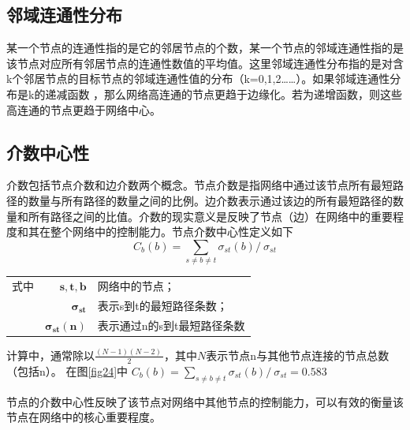 \subsection{邻域连通性分布}
某一个节点的连通性指的是它的邻居节点的个数，某一个节点的邻域连通性指的是该节点对应所有邻居节点的连通性数值的平均值。这里邻域连通性分布指的是对含k个邻居节点的目标节点的邻域连通性值的分布（k=0,1,2……）。如果邻域连通性分布是k的递减函数 ，那么网络高连通的节点更趋于边缘化。若为递增函数，则这些高连通的节点更趋于网络中心。
\subsection{介数中心性}
介数包括节点介数和边介数两个概念。节点介数是指网络中通过该节点所有最短路径的数量与所有路径的数量之间的比例。边介数表示通过该边的所有最短路径的数量和所有路径之间的比值。介数的现实意义是反映了节点（边）在网络中的重要程度和其在整个网络中的控制能力。节点介数中心性定义如下
\begin{equation}\label{eq26}
	C_{b}( b) =\sum\limits _{s\neq b\neq t} \sigma_{st}( b) /\ \sigma_{st}
\end{equation}

\begin{tabularx}{\textwidth}{@{}l@{\quad}r@{———}X@{}}
式中 & $\boldsymbol{s,t,b}$ &  网络中的节点；\\
	& $\boldsymbol{ \sigma_{st}}$ &   表示s到t的最短路径条数；\\
	& $\boldsymbol{\sigma_{st}( n)}$ &	表示通过n的s到t最短路径条数 \\
\end{tabularx}\vspace{3.15bp}
计算中，通常除以$\frac{( N-1)( N-2) \ }{2}$，其中$N$表示节点n与其他节点连接的节点总数（包括n）。
在图\ref{fig24}中 $C_{b}( b) =\sum\limits _{s\neq b\neq t} \sigma_{st}( b) /\ \sigma_{st} =  0.583$

节点的介数中心性反映了该节点对网络中其他节点的控制能力，可以有效的衡量该节点在网络中的核心重要程度。


